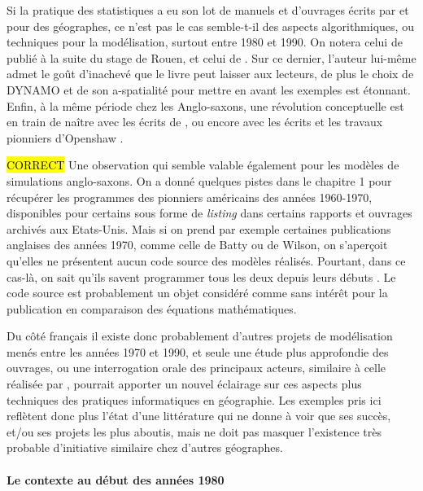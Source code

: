 Si la pratique des statistiques a eu son lot de manuels et d'ouvrages écrits par et pour des géographes, ce n'est pas le cas semble-t-il des aspects algorithmiques, ou techniques pour la modélisation, surtout entre 1980 et 1990. On notera celui de \textcite{Guermond1984} publié à la suite du stage de Rouen, et celui de \textcite{Dauphine1987}. Sur ce dernier, l'auteur lui-même admet le goût d'inachevé que le livre peut laisser aux lecteurs, de plus le choix de DYNAMO et de son a-spatialité pour mettre en avant les exemples est étonnant. Enfin, à la même période chez les Anglo-saxons, une révolution conceptuelle est en train de naître avec les écrits de \textcite{Couclelis1985}, ou encore avec les écrits et les travaux pionniers d'Openshaw \autocites{Openshaw1983, Openshaw1988, Openshaw2000}.

\hl{CORRECT}
Une observation qui semble valable également pour les modèles de simulations anglo-saxons. On a donné quelques pistes dans le chapitre 1 pour récupérer les programmes des pionniers américains des années 1960-1970, disponibles pour certains sous forme de \textit{listing} dans certains rapports et ouvrages archivés aux Etats-Unis. Mais si on prend par exemple certaines publications anglaises des années 1970, comme celle de Batty \autocite{Batty1976} ou de Wilson, on s'aperçoit qu'elles ne présentent aucun code source des modèles réalisés. Pourtant, dans ce cas-là, on sait qu'ils savent programmer tous les deux depuis leurs débuts \autocites{Batty1971b, Batty2014}. Le code source est probablement un objet considéré comme sans intérêt pour la publication en comparaison des équations mathématiques.

Du côté français il existe donc probablement d'autres projets de modélisation menés entre les années 1970 et 1990, et seule une étude plus approfondie des ouvrages, ou une interrogation orale des principaux acteurs, similaire à celle réalisée par \textcite{Cuyala2014}, pourrait apporter un nouvel éclairage sur ces aspects plus techniques des pratiques informatiques en géographie. Les exemples pris ici reflètent donc plus l'état d'une littérature qui ne donne à voir que ses succès, et/ou ses projets les plus aboutis, mais ne doit pas masquer l'existence très probable d'initiative similaire chez d'autres géographes.

\paragraph{Le contexte au début des années 1980}

